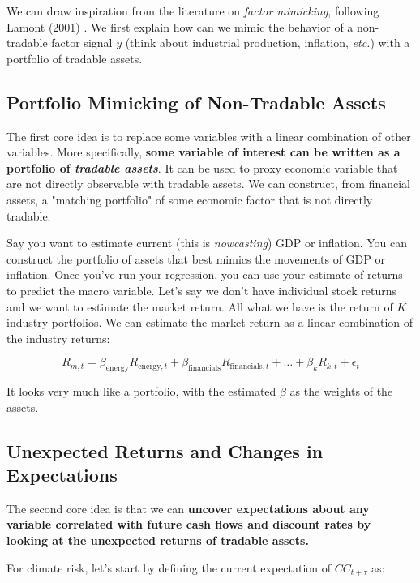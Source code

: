 We can draw inspiration from the literature
on \textit{factor mimicking}, 
following Lamont (2001) \cite{lamont2001economic}.
We first explain how can we mimic the behavior 
of a non-tradable factor signal $y$ (think about industrial 
production, inflation, \textit{etc.}) with a portfolio of tradable assets.


\subsection{Portfolio Mimicking of Non-Tradable Assets}

The first core idea is to replace some variables with 
a linear combination of other variables. More
specifically, \textbf{some variable of interest can be
written as a portfolio of \textit{tradable assets}}.
It can be used to proxy economic 
variable that 
are not directly observable with tradable assets.
We can construct, from financial assets, 
a "matching portfolio" of some economic factor
that is
not directly tradable.


Say you want to estimate current (this is \textit{nowcasting})
GDP or inflation. You can construct the portfolio 
of assets that best mimics the movements of GDP or inflation.
Once you've run your regression, you can use your 
estimate of returns to predict the macro variable.
Let's say we don't have individual 
stock returns and we want to estimate 
the market return. All what we have is
the return of $K$ industry portfolios. We 
can estimate the market return as a 
linear combination of the industry returns:

\begin{equation}
R_{m,t} = \beta_{\text{energy}} R_{\text{energy},t} + \beta_{\text{financials}} R_{\text{financials},t} + \ldots + \beta_{k} R_{k,t} + \epsilon_{t}
\end{equation}

It looks very much like a portfolio, with 
the estimated $\beta$ as the weights of the assets.


\subsection{Unexpected Returns and Changes in Expectations}

The second core idea is that 
we can \textbf{uncover expectations about any variable
correlated with future cash flows and discount rates
by looking at the unexpected returns of tradable assets.}

For climate risk, let's start by defining the current expectation
of $CC_{t+\tau}$ as:

